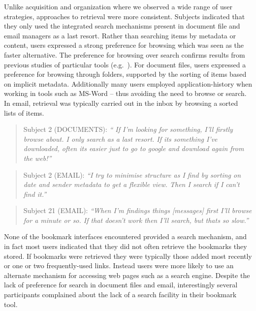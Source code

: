 Unlike acquisition and organization where we observed a wide range of user strategies, approaches to retrieval were more consistent.
Subjects indicated that they only used the integrated search mechanisms present in document file and email managers as a last resort. 
Rather than searching items by metadata or content, users expressed a strong preference for browsing which was seen as the faster alternative. 
The preference for browsing over search confirms results from previous studies of particular tools (e.g.~\cite{bn:95}).
For document files, users expressed a preference for browsing through folders, supported by the sorting of items based on implicit metadata. Additionally many users employed application-history when working in tools such as MS-Word -- thus avoiding the need to browse or search.
In email, retrieval was typically carried out in the inbox by browsing a sorted lists of items.

\begin{quote}
Subject 2 (DOCUMENTS): \textit{`` If I'm looking for something, I'll firstly browse about.  I only search as a last resort. If its something I've downloaded, often its easier just to go to google and download again from the web!''}
\end{quote}

\begin{quote}
Subject 2 (EMAIL): \textit{``I try to minimise structure as I find by sorting on date and sender metadata to get a flexible view.  Then I search if I can't find it.''}
\end{quote}

\begin{quote}
Subject 21 (EMAIL): \textit{``When I'm findings things [messages] first I'll browse for a minute or so. If that doesn't work then I'll search, but thats so slow.''}
\end{quote}

\noindent 
None of the bookmark interfaces encountered provided a search mechanism, and in fact most users indicated that they did not often retrieve the bookmarks they stored. If bookmarks were retrieved they were typically those added most recently or one or two frequently-used links. Instead users were more likely to use an alternate mechanism for accessing web pages such as a search engine.  Despite the lack of preference for search in document files and email, interestingly several participants complained about the lack of a search facility in their bookmark tool.
\\


